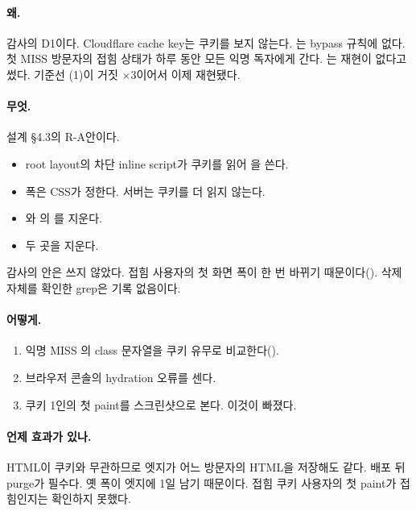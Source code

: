 \paragraph{왜.}
감사의 D1이다. Cloudflare cache key는 쿠키를 보지 않는다.
는 bypass 규칙에 없다.
첫 MISS 방문자의 접힘 상태가 하루 동안 모든 익명 독자에게 간다.
는 재현이 없다고 썼다. 기준선 (1)이 거짓 $\times$3이어서 이제 재현됐다.

\paragraph{무엇.}
설계 \S4.3의 R-A안이다.
\begin{itemize}[nosep]
  \item root layout의 차단 inline script가 쿠키를 읽어 을 쓴다.
  \item 폭은 CSS가 정한다. 서버는 쿠키를 더 읽지 않는다.
  \item {}와 의 를 지운다.
  \item {} 두 곳을 지운다.
\end{itemize}
감사의 안은 쓰지 않았다. 접힘 사용자의 첫 화면 폭이 한 번 바뀌기 때문이다().
삭제 자체를 확인한 grep은 기록 없음이다.

\paragraph{어떻게.}
\begin{enumerate}[nosep]
  \item 익명 MISS 의  class 문자열을 쿠키 유무로 비교한다().
  \item 브라우저 콘솔의 hydration 오류를 센다.
  \item 쿠키 1인의 첫 paint를 스크린샷으로 본다. 이것이 빠졌다.
\end{enumerate}

\paragraph{언제 효과가 있나.}
HTML이 쿠키와 무관하므로 엣지가 어느 방문자의 HTML을 저장해도 같다.
배포 뒤 purge가 필수다. 옛 폭이 엣지에 1일 남기 때문이다.
접힘 쿠키 사용자의 첫 paint가 접힘인지는 확인하지 못했다.

